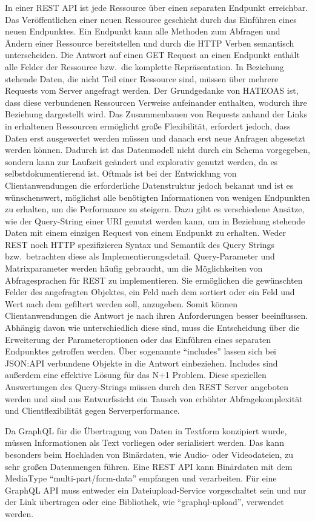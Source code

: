 In einer REST API ist jede Ressource über einen separaten Endpunkt erreichbar.
Das Veröffentlichen einer neuen Ressource geschieht durch das Einführen eines neuen Endpunktes.
Ein Endpunkt kann alle Methoden zum Abfragen und Ändern einer Ressource bereitstellen und durch die HTTP Verben semantisch unterscheiden.
Die Antwort auf einen GET Request an einen Endpunkt enthält alle Felder der Ressource bzw.\ die komplette Repräsentation.
In Beziehung stehende Daten, die nicht Teil einer Ressource sind, müssen über mehrere Requests vom Server angefragt werden.
Der Grundgedanke von HATEOAS ist, dass diese verbundenen Ressourcen Verweise aufeinander enthalten, wodurch ihre Beziehung dargestellt wird.
Das Zusammenbauen von Requests anhand der Links in erhaltenen Ressourcen ermöglicht große Flexibilität, erfordert jedoch, dass Daten erst ausgewertet werden müssen und danach erst neue Anfragen abgesetzt werden können.
Dadurch ist das Datenmodell nicht durch ein Schema vorgegeben, sondern kann zur Laufzeit geändert und explorativ genutzt werden, da es selbstdokumentierend ist.
Oftmals ist bei der Entwicklung von Clientanwendungen die erforderliche Datenstruktur jedoch bekannt und ist es wünschenswert, möglichst alle benötigten Informationen von wenigen Endpunkten zu erhalten, um die Performance zu steigern.
Dazu gibt es verschiedene Ansätze, wie der Query-String einer URI genutzt werden kann, um in Beziehung stehende Daten mit einem einzigen Request von einem Endpunkt zu erhalten.
Weder REST noch HTTP spezifizieren Syntax und Semantik des Query Strings bzw.\ betrachten diese als Implementierungsdetail.
Query-Parameter und Matrixparameter werden häufig gebraucht, um die Möglichkeiten von Abfragesprachen für REST zu implementieren.
Sie ermöglichen \zB{} die gewünschten Felder des angefragten Objektes, ein Feld nach dem sortiert oder ein Feld und Wert nach dem gefiltert werden soll, anzugeben.
Somit können Clientanwendungen die Antwort je nach ihren Anforderungen besser beeinflussen.
Abhängig davon wie unterschiedlich diese sind, muss die Entscheidung über die Erweiterung der Parameteroptionen oder das Einführen eines separaten Endpunktes getroffen werden.
Über sogenannte \enquote{includes} lassen sich bei JSON:API verbundene Objekte in die Antwort einbeziehen.
Includes sind außerdem eine effektive Lösung für das N+1 Problem.
Diese speziellen Auswertungen des Query-Strings müssen durch den REST Server angeboten werden und sind aus Entwurfssicht ein Tausch von erhöhter Abfragekomplexität und Clientflexibilität gegen Serverperformance.
\par
Da GraphQL für die Übertragung von Daten in Textform konzipiert wurde, müssen Informationen als Text vorliegen oder serialisiert werden.
Das kann besonders beim Hochladen von Binärdaten, wie Audio- oder Videodateien, zu sehr großen Datenmengen führen.
Eine REST API kann Binärdaten mit dem MediaType \enquote{multi-part/form-data} empfangen und verarbeiten.
Für eine GraphQL API muss entweder ein Dateiupload-Service vorgeschaltet sein und nur der Link übertragen oder eine Bibliothek, wie \enquote{graphql-upload}, verwendet werden.

